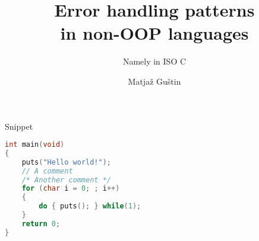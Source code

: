 \documentclass[pdf]{beamer}
\title{Error handling patterns\\in non-OOP languages}
\subtitle{Namely in ISO C}
\author{Matjaž Guštin}
\begin{document}
\begin{frame}
    \titlepage
\end{frame}

\begin{frame}[fragile]{Snippet}
\begin{lstlisting}[language=C,style=cstyle]
int main(void)
{
    puts("Hello world!");
    // A comment
    /* Another comment */
    for (char i = 0; ; i++)
    {
        do { puts(); } while(1);
    }
    return 0;
}
\end{lstlisting}
\end{frame}
\end{document}
